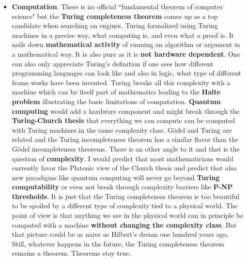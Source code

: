 \documentclass[12pt]{amsart}
\begin{document}
\begin{itemize}
\item {\bf Computation}. There is no official ``fundamental theorem of computer science" but
the {\bf Turing completeness theorem} comes up as a top candidate when searching on engines. 
Turing formalized using Turing machines in a precise way, what computing is, and even what a 
proof is. It nails down {\bf mathematical activity} of running an algorithm or argument in a 
mathematical way. It is also pure as it is {\bf not hardware dependent}. One can also only appreciate
Turing's definition if one sees how different programming languages can look like and also in
logic, what type of different frame works have been invented. Turing breaks all this complexity with
a machine which can be itself part of mathematics leading to the {\bf Halte problem} illustrating the
basic limitations of computation. {\bf Quantum computing} would add a
hardware component and might break through the {\bf Turing-Church thesis} that everything we can 
compute can be computed with Turing machines in the same complexity class. 
G\"odel and Turing are related and the Turing incompleteness theorem has a 
similar flavor than the G\"odel incompleteness theorems. There is an other angle to it and that is 
the question of {\bf complexity}. I would predict that most mathematicians
would currently favor the Platonic view of the Church thesis and predict that 
also new paradigms like quantum computing will never go beyond {\bf Turing computability} or 
even not break through complexity barriers like {\bf P-NP thresholds}.
It is just that the Turing completeness theorem is too beautiful to be spoiled by a different
type of complexity tied to a physical world. The point of view is that anything we see in 
the  physical world can in principle be computed with a machine {\bf without changing the
complexity class}. But that picture could be as naive as Hilbert's dream one hundred years ago. 
Still, whatever happens in the future, the Turing completeness theorem remains a theorem. Theorems
stay true. 


\end{itemize}
\end{document}
